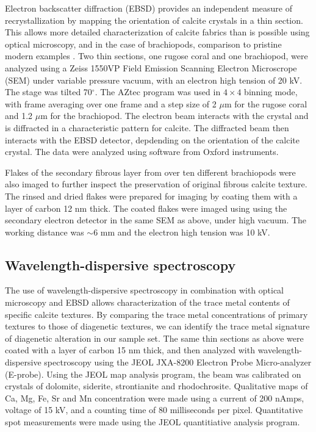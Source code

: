 \documentclass{article}
\begin{document}
Electron backscatter diffraction (EBSD) provides an independent measure of recrystallization by mapping the orientation of calcite crystals in a thin section. This allows more detailed characterization of calcite fabrics than is possible using optical microscopy, and in the case of brachiopods, comparison to pristine modern examples \citep{PerezHuerta2007}. Two thin sections, one rugose coral and one brachiopod, were analyzed using a Zeiss 1550VP Field Emission Scanning Electron Microscrope (SEM) under variable pressure vacuum, with an electron high tension of 20 kV. The stage was tilted 70$^{\circ}$. The AZtec program was used in $4\times4$ binning mode, with frame averaging over one frame and a step size of 2 $\mu$m for the rugose coral and 1.2 $\mu$m for the brachiopod. The electron beam interacts with the crystal and is diffracted in a characteristic pattern for calcite. The diffracted beam then interacts with the EBSD detector, depdending on the orientation of the calcite crystal. The data were analyzed using software from Oxford instruments.

Flakes of the secondary fibrous layer from over ten different brachiopods were also imaged to further inspect the preservation of original fibrous calcite texture. The rinsed and dried flakes were prepared for imaging by coating them with a layer of carbon 12 nm thick. The coated flakes were imaged using using the secondary electron detector in the same SEM as above, under high vacuum. The working distance was $\sim 6$ mm and the electron high tension was 10 kV. 

\subsection{Wavelength-dispersive spectroscopy}

The use of wavelength-dispersive spectroscopy in combination with optical microscopy and EBSD allows characterization of the trace metal contents of specific calcite textures. By comparing the trace metal concentrations of primary textures to those of diagenetic textures, we can identify the trace metal signature of diagenetic alteration in our sample set. The same thin sections as above were coated with a layer of carbon 15 nm thick, and then analyzed with wavelength-dispersive spectroscopy using the JEOL JXA-8200 Electron Probe Micro-analyzer (E-probe). Using the JEOL map analysis program, the beam was calibrated on crystals of dolomite, siderite, strontianite and rhodochrosite. Qualitative maps of Ca, Mg, Fe, Sr and Mn concentration were made using a current of 200 nAmps, voltage of 15 kV, and a counting time of 80 milliseconds per pixel. Quantitative spot measurements were made using the JEOL quantitiative analysis program. 
\end{document}
